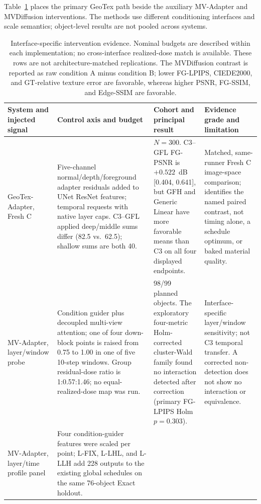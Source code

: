 \documentclass[times,twocolumn,final]{elsarticle}
\providecommand{\DIFadd}[1]{{\protect\color{blue} \sf #1}} %
\providecommand{\DIFaddbegin}{} %
\providecommand{\DIFaddend}{} %
\providecommand{\DIFaddFL}[1]{\DIFadd{#1}} %
\providecommand{\DIFaddbeginFL}{\DIFaddbegin} %
\providecommand{\DIFaddendFL}{\DIFaddend} %
\renewcommand{\DIFaddbeginFL}{}
\renewcommand{\DIFaddendFL}{}
\renewcommand{\DIFaddFL}[1]{#1}
\begin{document}
\DIFadd{Table~\ref{tab:cross-interface} places the primary GeoTex path beside the auxiliary MV-Adapter and MVDiffusion interventions. The methods use different conditioning interfaces and scale semantics; object-level results are not pooled across systems.
}

\begin{table}[t]
\centering
\scriptsize
\setlength{\tabcolsep}{3pt}
\caption{Interface-specific intervention evidence. Nominal budgets are described within each implementation; no cross-interface realized-dose match is available. These rows are not architecture-matched replications. The MVDiffusion contrast is reported as raw condition A minus condition B; lower FG-LPIPS, CIEDE2000, and GT-relative texture error are favorable, whereas higher PSNR, FG-SSIM, and Edge-SSIM are favorable.}
\label{tab:cross-interface}
\begin{tabular}{p{2.4cm}p{4.0cm}p{4.2cm}p{4.5cm}}
\toprule
\DIFaddFL{System and injected signal }& \DIFaddFL{Control axis and budget }& \DIFaddFL{Cohort and principal result }& \DIFaddFL{Evidence grade and limitation }\\
\midrule
\DIFaddFL{GeoTex-Adapter, Fresh C }&
\DIFaddFL{Five-channel normal/depth/foreground adapter residuals added to UNet ResNet features; temporal requests with native layer caps. C3--GFL applied deep/middle sums differ (82.5 vs.\ 62.5); shallow sums are both 40. }&
\DIFaddFL{$N=300$. C3--GFL FG-PSNR is $+0.522$~dB }[\DIFaddFL{0.404, 0.641}]\DIFaddFL{, but GFH and Generic Linear have more favorable means than }\DIFaddendFL C3   \DIFaddbeginFL \DIFaddFL{on all four displayed endpoints. }&
\DIFaddFL{Matched, same-runner Fresh C image-space comparison; identifies the named paired contrast, not timing alone, a schedule optimum, or baked material quality. }\\
\DIFaddFL{MV-Adapter, layer/window probe }&
\DIFaddFL{Condition guider plus decoupled multi-view attention; one of four down-block points is raised from 0.75 to 1.00 in one of five 10-step windows. Group residual-dose ratio is 1:0.57:1.46; no equal-realized-dose map was run. }&
\DIFaddFL{98/99 planned objects. The exploratory four-metric Holm-corrected cluster-Wald family found no interaction detected after correction (primary FG-LPIPS Holm $p=0.303$). }&
\DIFaddFL{Interface-specific layer/window sensitivity; not C3 temporal transfer. A corrected non-detection does not show no interaction or equivalence. }\\
\DIFaddFL{MV-Adapter, layer/time profile panel }&
\DIFaddFL{Four condition-guider features were scaled per point; L-FIX, L-LHL, and L-LLH add 228 outputs to the existing global schedules on the same 76-object Exact holdout. }&

\end{tabular}
\end{table}
\end{document}
